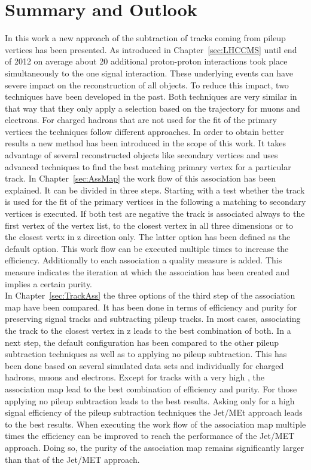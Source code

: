 \chapter{Summary and Outlook \label{sec:SandO}}

In this work a new approach of the subtraction of tracks coming from pileup vertices has been presented. As introduced in Chapter~\ref{sec:LHCCMS} until end of 2012 on average about 20 additional proton-proton interactions took place simultaneously to the one signal interaction. These underlying events can have severe impact on the reconstruction of all objects. To reduce this impact, two techniques have been developed in the past. Both techniques are very similar in that way that they only apply a selection based on the trajectory for muons and electrons. For charged hadrons that are not used for the fit of the primary vertices the techniques follow different approaches. In order to obtain better results a new method has been introduced in the scope of this work. It takes advantage of several reconstructed objects like secondary vertices and uses advanced techniques to find the best matching primary vertex for a particular track. In Chapter~\ref{sec:AssMap} the work flow of this association has been explained. It can be divided in three steps. Starting with a test whether the track is used for the fit of the primary vertices in the following a matching to secondary vertices is executed. If both test are negative the track is associated always to the first vertex of the vertex list, to the closest vertex in all three dimensions or to the closest vertx in z direction only. The latter option has been defined as the default option. This work flow can be executed multiple times to increase the efficiency. Additionally to each association a quality measure is added. This measure indicates the iteration at which the association has been created and implies a certain purity. \\
In Chapter~\ref{sec:TrackAss} the three options of the third step of the association map have been compared. It has been done in terms of efficiency and purity for preserving signal tracks and subtracting pileup tracks. In most cases, associating the track to the closest vertex in z leads to the best combination of both.  In a next step, the default configuration has been compared to the other pileup subtraction techniques as well as to applying no pileup subtraction. This has been done based on several simulated data sets and individually for charged hadrons, muons and electrons. Except for tracks with a very high \pt{}, the association map lead to the best combination of efficiency and purity.  For those applying no pileup subtraction leads to the best results. Asking only for a high signal efficiency of the pileup subtraction techniques the Jet/MEt approach leads to the best results. When executing the work flow of the association map multiple times the efficiency can be improved to reach the performance of the Jet/MET approach. Doing so, the purity of the association map remains significantly larger than that of the Jet/MET approach.  \\
